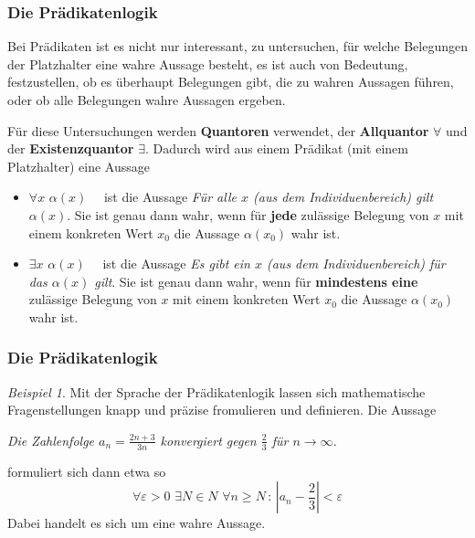 \documentclass[hyperref={pdfpagelabels=false}]{beamer}
\theoremstyle{plain}%
\theoremstyle{definition}
\theoremstyle{remark}
\newtheorem*{beispiel}{Beispiel}
\begin{document}
\begin{frame}
\frametitle{Die Prädikatenlogik}

Bei Prädikaten ist es nicht nur interessant, zu untersuchen, für welche Belegungen der Platzhalter eine wahre 
Aussage besteht, es ist auch von Bedeutung, festzustellen, ob es überhaupt Belegungen gibt, die zu wahren 
Aussagen führen, oder ob alle Belegungen wahre Aussagen ergeben. 

\pause 

Für diese Untersuchungen werden \textbf{Quantoren} verwendet, der \textbf{Allquantor} $\forall$ 
und der \textbf{Existenzquantor} $\exists$. Dadurch wird aus einem Prädikat (mit einem Platzhalter) 
eine Aussage

\pause 

\begin{itemize}
\item $\forall x \,\, \alpha(x) \quad$ ist die Aussage \glqq{}\textit{Für alle $x$ (aus dem
Individuenbereich) gilt $\alpha(x)$}\grqq{}. Sie ist genau dann wahr, wenn für \textbf{jede} 
zulässige Belegung von $x$ mit einem konkreten Wert $x_0$ die Aussage $\alpha(x_0)$ wahr ist.
\item $\exists x \,\, \alpha(x) \quad$ ist die Aussage \glqq{}\textit{Es gibt ein $x$ (aus dem
Individuenbereich) für das $\alpha(x)$ gilt}\grqq{}. Sie ist genau dann wahr, wenn für 
\textbf{mindestens eine} zulässige Belegung von $x$ mit einem konkreten Wert $x_0$ die 
Aussage $\alpha(x_0)$ wahr ist.
\end{itemize}

\end{frame}


\begin{frame}
\frametitle{Die Prädikatenlogik}

\begin{beispiel}
Mit der Sprache der Prädikatenlogik lassen sich mathematische Fragenstellungen knapp und präzise fromulieren 
und definieren. \pause Die Aussage

\centerline{ \textit{Die Zahlenfolge $a_n = \frac {2n+3}{3n}$ konvergiert gegen $\frac {2}{3}$ 
für $n \rightarrow \infty$.}}

formuliert sich dann etwa so \pause
  	$$ \forall \varepsilon > 0 \,\, \exists N \in N \,\, \forall n \geq N \, : \,  
	\left\vert a_n - \frac {2}{3} \right\vert < \varepsilon $$
\pause 
Dabei handelt es sich um eine wahre Aussage.

\end{beispiel}

\end{frame}
\end{document}
